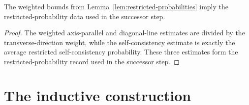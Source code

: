 \begin{lemma}\label{lem:weighted-restricted-probability-bounds}
	\leanok
	The weighted bounds from Lemma~\ref{lem:restricted-probabilities} imply the
	restricted-probability data used in the successor step.
\end{lemma}
\begin{proof}
	\leanok
	The weighted axis-parallel and diagonal-line estimates are divided by the
	transverse-direction weight, while the self-consistency estimate is exactly
	the average restricted self-consistency probability. These three estimates
	form the restricted-probability record used in the successor step.
\end{proof}

\section{The inductive construction}

